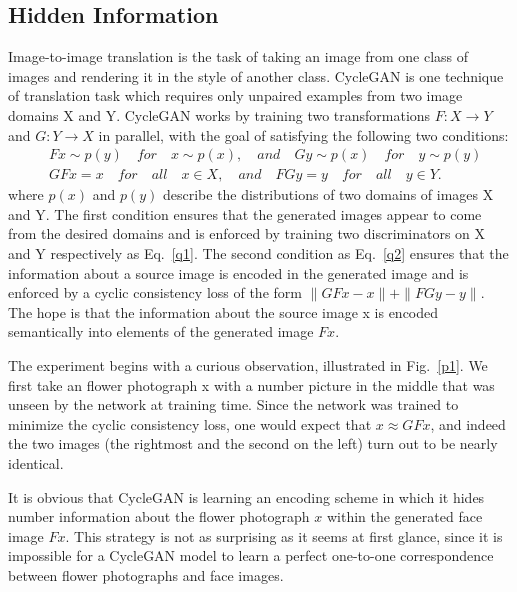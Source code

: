 \documentclass[a4paper]{article}
\begin{document}
	\subsection{Hidden Information}
	
	Image-to-image translation is the task of taking an image from one class of images and rendering it in the style of another class. CycleGAN is one technique of translation task which requires only unpaired examples from two image domains X and Y. CycleGAN works by training two transformations $F: X\rightarrow Y $and $G: Y\rightarrow X $ in parallel, with the goal of satisfying the following two conditions: 
	\begin{align}
    & F x\sim p(y)\quad for\quad x\sim p(x), \quad and\quad G y\sim p(x) \quad for\quad  y\sim p(y)  \label{q1} \\ 
    & GF x = x\quad for\quad all\quad x\in X, \quad and\quad FGy = y\quad for\quad all\quad  y\in Y.  \label{q2}
	\end{align} 
	where $p(x)$ and $p(y)$ describe the distributions of two domains of images X and Y. The first condition ensures that the generated images appear to come from the desired domains and is enforced by training two discriminators on X and Y respectively as Eq.~\ref{q1}. The second condition as Eq.~\ref{q2} ensures that the information about a source image is encoded in the generated image and is enforced by a cyclic consistency loss of the form $\parallel GF x-x\parallel + \parallel F Gy-y\parallel$. The hope is that the information about the source image x is encoded semantically into elements of the generated image $F x$.
	
	The experiment begins with a curious observation, illustrated in Fig.~\ref{p1}. We first take an flower photograph x with a number picture in the middle that	was unseen by the network at training time. Since the network was trained to minimize the cyclic consistency loss, one would expect that $x\approx GF x$, and indeed the two images (the rightmost and the second on the left) turn out to be nearly	identical.
	
	It is obvious that CycleGAN is learning an encoding scheme in which it hides number information about the flower photograph $x$ within the generated face image $F x$. This strategy is not as surprising as it seems at first glance, since it is impossible for a CycleGAN model to learn a perfect one-to-one correspondence between flower photographs and face images.
	
\end{document}
